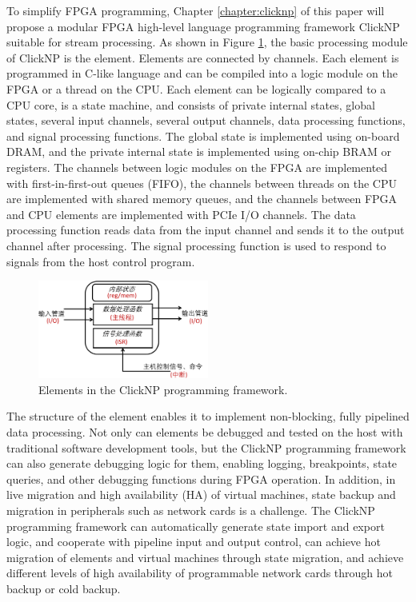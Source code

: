To simplify FPGA programming, Chapter \ref{chapter:clicknp} of this paper will propose a modular FPGA high-level language programming framework ClickNP suitable for stream processing.
As shown in Figure \ref{arch:fig:element_arch}, the basic processing module of ClickNP is the element. Elements are connected by channels.
Each element is programmed in C-like language and can be compiled into a logic module on the FPGA or a thread on the CPU.
Each element can be logically compared to a CPU core, is a state machine, and consists of private internal states, global states, several input channels, several output channels, data processing functions, and signal processing functions.
The global state is implemented using on-board DRAM, and the private internal state is implemented using on-chip BRAM or registers.
The channels between logic modules on the FPGA are implemented with first-in-first-out queues (FIFO), the channels between threads on the CPU are implemented with shared memory queues, and the channels between FPGA and CPU elements are implemented with PCIe I/O channels.
The data processing function reads data from the input channel and sends it to the output channel after processing. The signal processing function is used to respond to signals from the host control program.

\begin{figure}[htbp]
	\centering
	\includegraphics[width=0.5\textwidth]{chapters/clicknp/image/element_arch.pdf}
	\caption{Elements in the ClickNP programming framework.}
	\label{arch:fig:element_arch}
\end{figure}

The structure of the element enables it to implement non-blocking, fully pipelined data processing.
Not only can elements be debugged and tested on the host with traditional software development tools, but the ClickNP programming framework can also generate debugging logic for them, enabling logging, breakpoints, state queries, and other debugging functions during FPGA operation.
In addition, in live migration and high availability (HA) of virtual machines, state backup and migration in peripherals such as network cards is a challenge.
The ClickNP programming framework can automatically generate state import and export logic, and cooperate with pipeline input and output control, can achieve hot migration of elements and virtual machines through state migration, and achieve different levels of high availability of programmable network cards through hot backup or cold backup.


